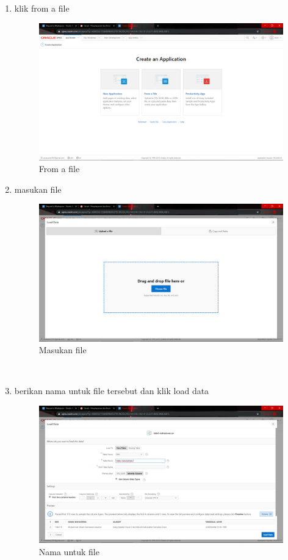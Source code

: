 \begin{enumerate}
\item klik from a file

\begin{figure}[H]
    \centering
    \includegraphics[scale=0.2]{figures/11}
    \caption{From a file}
    \label{Figureanaconda70}
\end{figure}
\item masukan file 

\begin{figure}[H]
    \centering
    \includegraphics[scale=0.2]{figures/14}
    \caption{Masukan file}
    \label{Figureanaconda70}
\end{figure} \\


\item berikan nama untuk file tersebut dan klik load data
\begin{figure}[H]
    \centering
    \includegraphics[scale=0.2]{figures/12}
    \caption{Nama untuk file}
    \label{Figureanaconda70}
\end{figure} \\


\end{enumerate}
